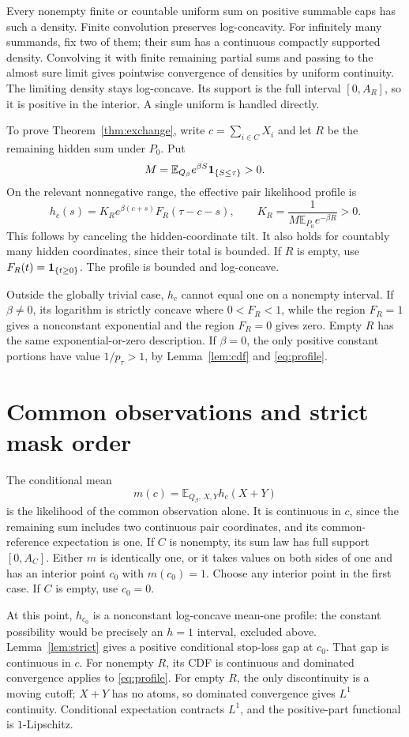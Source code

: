 \documentclass[11pt,a4paper]{article}
\theoremstyle{remark}\newtheorem*{ednote}{Editorial note (ProveIt, 2026-10-01)}
\newcommand{\E}{\mathbb E}\newcommand{\R}{\mathbb R}
\begin{document}
Every nonempty finite or countable uniform sum on positive summable caps has such a density. Finite convolution preserves log-concavity. For infinitely many summands, fix two of them; their sum has a continuous compactly supported density. Convolving it with finite remaining partial sums and passing to the almost sure limit gives pointwise convergence of densities by uniform continuity. The limiting density stays log-concave. Its support is the full interval $[0,A_R]$, so it is positive in the interior. A single uniform is handled directly.

To prove Theorem~\ref{thm:exchange}, write $c=\sum_{i\in C}X_i$ and let $R$ be the remaining hidden sum under $P_0$. Put
\[
 M=\E_{Q_\beta}e^{\beta S}\ind_{\{S\le\tau\}}>0.
\]
On the relevant nonnegative range, the effective pair likelihood profile is
\begin{equation}\label{eq:profile}
 h_c(s)=K_R e^{\beta(c+s)}F_R(\tau-c-s),
 \qquad K_R=\frac1{M\E_{P_0}e^{-\beta R}}>0.
\end{equation}
This follows by canceling the hidden-coordinate tilt. It also holds for countably many hidden coordinates, since their total is bounded. If $R$ is empty, use $F_R(t)=\mathbf1_{\{t\ge0\}}$. The profile is bounded and log-concave.

Outside the globally trivial case, $h_c$ cannot equal one on a nonempty interval. If $\beta\ne0$, its logarithm is strictly concave where $0<F_R<1$, while the region $F_R=1$ gives a nonconstant exponential and the region $F_R=0$ gives zero. Empty $R$ has the same exponential-or-zero description. If $\beta=0$, the only positive constant portions have value $1/p_\tau>1$, by Lemma~\ref{lem:cdf} and \eqref{eq:profile}.

\section{Common observations and strict mask order}
The conditional mean
\[
 m(c)=\E_{Q_\beta,\,X,Y}h_c(X+Y)
\]
is the likelihood of the common observation alone. It is continuous in $c$, since the remaining sum includes two continuous pair coordinates, and its common-reference expectation is one. If $C$ is nonempty, its sum law has full support $[0,A_C]$. Either $m$ is identically one, or it takes values on both sides of one and has an interior point $c_0$ with $m(c_0)=1$. Choose any interior point in the first case. If $C$ is empty, use $c_0=0$.

At this point, $h_{c_0}$ is a nonconstant log-concave mean-one profile: the constant possibility would be precisely an $h=1$ interval, excluded above. Lemma~\ref{lem:strict} gives a positive conditional stop-loss gap at $c_0$. That gap is continuous in $c$. For nonempty $R$, its CDF is continuous and dominated convergence applies to \eqref{eq:profile}. For empty $R$, the only discontinuity is a moving cutoff; $X+Y$ has no atoms, so dominated convergence gives $L^1$ continuity. Conditional expectation contracts $L^1$, and the positive-part functional is $1$-Lipschitz.
\end{document}
